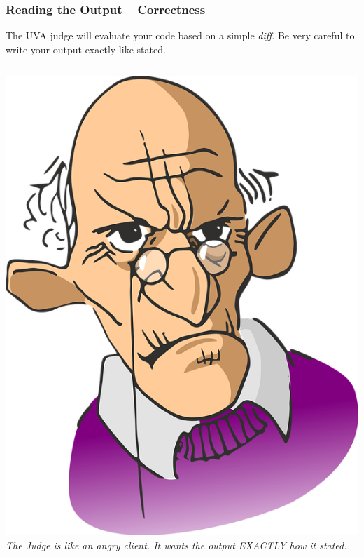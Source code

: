 \documentclass{beamer}
\begin{document}
\begin{frame}
  \frametitle{Reading the Output -- Correctness}

  The UVA judge will evaluate your code based on a simple \emph{diff}. 
  Be \alert{very careful} to write your output exactly like stated.

  \vfill

  \begin{columns}
    \includegraphics[width=1\textwidth]{../img/angryclient}
     \emph{The Judge is like an angry client. It
      wants the output EXACTLY how it stated.}
  \end{columns}
\end{frame}
\end{document}
